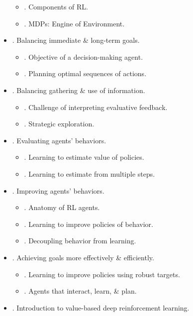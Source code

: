 \documentclass{article}
\begin{document}
\begin{itemize}
    \begin{itemize}
        \item {. Components of RL.}
        \item {. MDPs: Engine of Environment.}
    \end{itemize}
    \item {. Balancing immediate \& long-term goals.}
    \begin{itemize}
        \item {. Objective of a decision-making agent.}
        \item {. Planning optimal sequences of actions.}
    \end{itemize}
    \item {. Balancing gathering \& use of information.}
    \begin{itemize}
        \item {. Challenge of interpreting evaluative feedback.}
        \item {. Strategic exploration.}
    \end{itemize}
    \item {. Evaluating agents' behaviors.}
    \begin{itemize}
        \item {. Learning to estimate value of policies.}
        \item {. Learning to estimate from multiple steps.}
    \end{itemize}
    \item {. Improving agents' behaviors.}
    \begin{itemize}
        \item {. Anatomy of RL agents.}
        \item {. Learning to improve policies of behavior.}
        \item {. Decoupling behavior from learning.}
    \end{itemize}
    \item {. Achieving goals more effectively \& efficiently.}
    \begin{itemize}
        \item {. Learning to improve policies using robust targets.}
        \item {. Agents that interact, learn, \& plan.}
    \end{itemize}
    \item {. Introduction to value-based deep reinforcement learning.}

\end{itemize}
\end{document}

